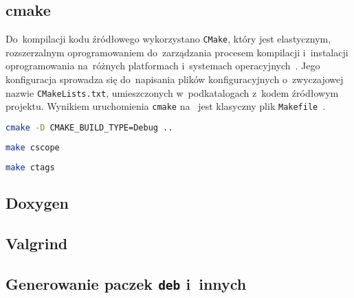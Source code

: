 \documentclass[thesis]{subfiles}
\begin{document}

\subsection{cmake}

Do~kompilacji kodu źródłowego wykorzystano \texttt{CMake}, który jest elastycznym, rozszerzalnym oprogramowaniem do~zarządzania procesem kompilacji i~instalacji oprogramowania na~różnych platformach i~systemach operacyjnych~\cite{cmake}. Jego konfiguracja sprowadza się do~napisania plików konfiguracyjnych o~zwyczajowej nazwie \mbox{\texttt{CMakeLists.txt}}, umieszczonych w~podkatalogach z~kodem źródłowym projektu. Wynikiem uruchomienia \texttt{cmake} na~ jest klasyczny plik \texttt{Makefile}~\cite{gnu-makefile-manual}.

\begin{lstlisting}[language=bash,numbers=none,caption={Uruchomienie \texttt{cmake} w~trybie \texttt{Debug}}]
cmake -D CMAKE_BUILD_TYPE=Debug ..
\end{lstlisting}

\begin{lstlisting}[language=bash,numbers=none,caption={Generowanie symboli dla \texttt{cscope}}]
make cscope
\end{lstlisting}

\begin{lstlisting}[language=bash,numbers=none,caption={Generowanie symboli dla \texttt{ctags}}]
make ctags
\end{lstlisting}


\subsection{Doxygen}


\subsection{Valgrind}


\subsection{Generowanie paczek \texttt{deb} i~innych}
\end{document}
